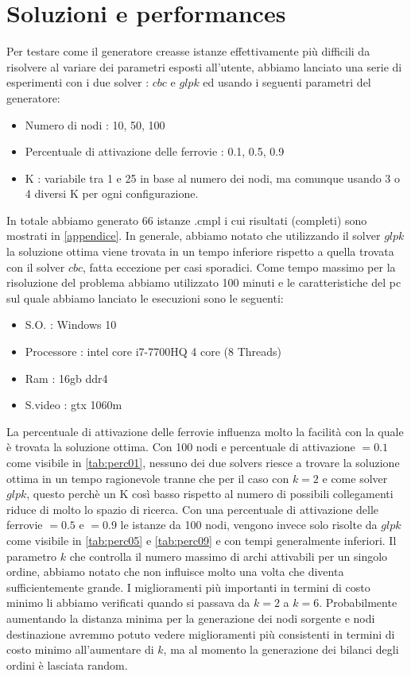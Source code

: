 \documentclass{article}
\begin{document}
\section{Soluzioni e performances}
Per testare come il generatore creasse istanze effettivamente più difficili da risolvere al variare dei parametri esposti all'utente, abbiamo lanciato una serie di esperimenti con i due solver : $cbc$ e $glpk$ ed usando i seguenti parametri del generatore:
\begin{itemize}
    \item Numero di nodi : 10, 50, 100
    \item Percentuale di attivazione delle ferrovie : 0.1, 0.5, 0.9
    \item K : variabile tra 1 e 25 in base al numero dei nodi, ma comunque usando 3 o 4 diversi K per ogni configurazione.
\end{itemize}
In totale abbiamo generato 66 istanze .cmpl i cui risultati (completi) sono mostrati in \cref{appendice}. In generale, abbiamo notato che utilizzando il solver $glpk$ la soluzione ottima viene trovata in un tempo inferiore rispetto a quella trovata con il solver $cbc$, fatta eccezione per casi sporadici. Come tempo massimo per la risoluzione del problema abbiamo utilizzato 100 minuti e le caratteristiche del pc sul quale abbiamo lanciato le esecuzioni sono le seguenti:
\begin{itemize}
    \item S.O. : Windows 10
    \item Processore : intel core i7-7700HQ 4 core (8 Threads)
    \item Ram : 16gb ddr4
    \item S.video : gtx 1060m
\end{itemize}
La percentuale di attivazione delle ferrovie influenza molto la facilità con la quale è trovata la soluzione ottima. Con 100 nodi e percentuale di attivazione $= 0.1$ come visibile in \cref{tab:perc01}, nessuno dei due solvers riesce a trovare la soluzione ottima in un tempo ragionevole tranne che per il caso con $k = 2$ e come solver $glpk$, questo perchè un K così basso rispetto al numero di possibili collegamenti riduce di molto lo spazio di ricerca. Con una percentuale di attivazione delle ferrovie $= 0.5$ e $=0.9$ le istanze da 100 nodi, vengono invece solo risolte da $glpk$ come visibile in \cref{tab:perc05} e \cref{tab:perc09} e con tempi generalmente inferiori.
Il parametro $k$ che controlla il numero massimo di archi attivabili per un singolo ordine, abbiamo notato che non influisce molto una volta che diventa sufficientemente grande. I miglioramenti più importanti in termini di costo minimo li abbiamo verificati quando si passava da $k = 2$ a $k = 6$. Probabilmente aumentando la distanza minima per la generazione dei nodi sorgente e nodi destinazione avremmo potuto vedere miglioramenti più consistenti in termini di costo minimo all'aumentare di $k$, ma al momento la generazione dei bilanci degli ordini è lasciata random.
\end{document}
